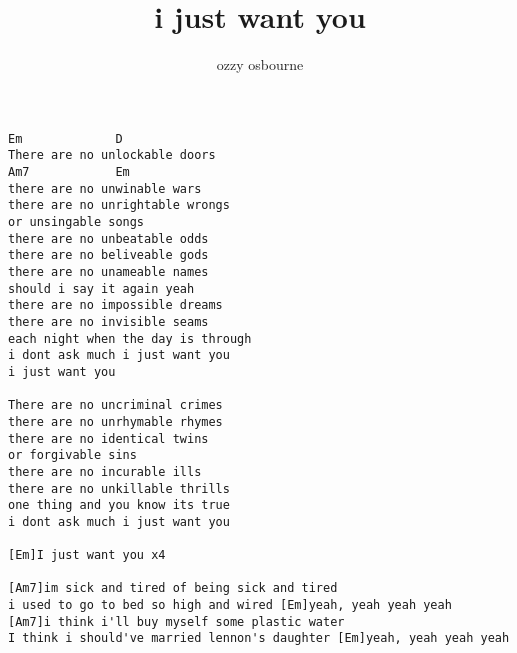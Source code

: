 \author{ozzy osbourne}
\title{i just want you}
\maketitle
\begin{verbatim}
Em             D         
There are no unlockable doors
Am7            Em             
there are no unwinable wars
there are no unrightable wrongs
or unsingable songs 
there are no unbeatable odds
there are no beliveable gods 
there are no unameable names 
should i say it again yeah 
there are no impossible dreams
there are no invisible seams 
each night when the day is through 
i dont ask much i just want you 
i just want you

There are no uncriminal crimes 
there are no unrhymable rhymes 
there are no identical twins 
or forgivable sins 
there are no incurable ills
there are no unkillable thrills
one thing and you know its true 
i dont ask much i just want you 

[Em]I just want you x4

[Am7]im sick and tired of being sick and tired 
i used to go to bed so high and wired [Em]yeah, yeah yeah yeah 
[Am7]i think i'll buy myself some plastic water 
I think i should've married lennon's daughter [Em]yeah, yeah yeah yeah 
\end{verbatim}